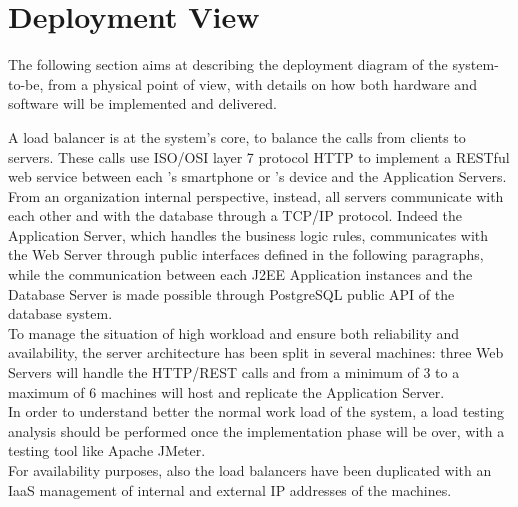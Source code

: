 \documentclass[../../DD.tex]{subfiles}
\begin{document}
\section{Deployment View\label{sect:2.3}}

The following section aims at describing the deployment diagram of the system-to-be, from a physical point of view, with details on how both hardware and software will be implemented and delivered.


A load balancer is at the system's core, to balance the calls from clients to servers. These calls use ISO/OSI layer 7 protocol HTTP to implement a RESTful web service between each 's smartphone or 's device and the Application Servers. \\ 

From an organization internal perspective, instead, all servers communicate with each other and with the database through a TCP/IP protocol. Indeed the Application Server, which handles the business logic rules, communicates with the Web Server through public interfaces defined in the following paragraphs, while the communication between each J2EE Application instances and the Database Server is made possible through PostgreSQL public API of the database system. \\

To manage the situation of high workload and ensure both reliability and availability, the server architecture has been split in several machines: three Web Servers will handle the HTTP/REST calls and from a minimum of 3 to a maximum of 6 machines will host and replicate the Application Server. \\
In order to understand better the normal work load of the system, a load testing analysis should be performed once the implementation phase will be over, with a testing tool like Apache JMeter. \\
For availability purposes, also the load balancers have been duplicated with an IaaS management of internal and external IP addresses of the machines. \\\\

\newpage
\end{document}
